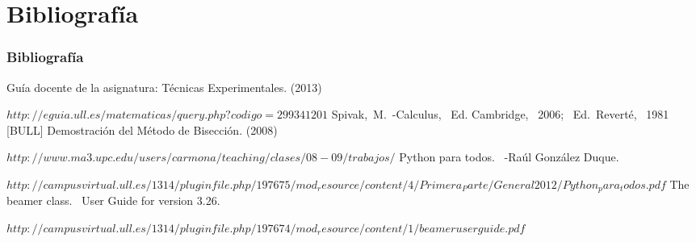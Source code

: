 \documentclass{beamer}
\begin{document}
\section{Bibliografía}
\begin{frame}
  \frametitle{Bibliografía}

  \begin{thebibliography}{10}
    Gu\'ia docente de la asignatura: T\'ecnicas Experimentales.
    (2013)
    
    {\tiny $http://eguia.ull.es/matematicas/query.php?codigo=299341201$}
    Spivak,~M.~-Calculus,~ Ed. Cambridge,~ 2006;~ Ed.~Revert\'e,~ 1981~ [BULL]
  Demostraci\'on del M\'etodo de Bisecci\'on.
  (2008)
  
  {\tiny $http://www.ma3.upc.edu/users/carmona/teaching/clases/08-09/trabajos/$}
  Python para todos. ~-Ra\'ul Gonz\'alez Duque.
  
  {\tiny $http://campusvirtual.ull.es/1314/pluginfile.php/197675/mod_resource/content/4/Primera_Parte/General2012/Python_para_todos.pdf$}
  The beamer class. ~User Guide for version 3.26.
  
  {\tiny $http://campusvirtual.ull.es/1314/pluginfile.php/197674/mod_resource/content/1/beameruserguide.pdf$}
  \end{thebibliography}
\end{frame}
\end{document}

